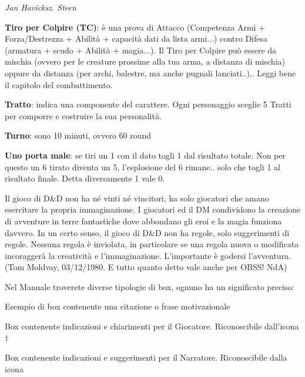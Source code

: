 \begin{multicols}{2}
\begin{center}
\emph{Jan Havicksz. Steen}
\end{center}

\textbf{Tiro per Colpire (TC)}: è una prova di Attacco (Competenza Armi + Forza/Destrezza + Abilità + capacità dati da lista armi...) contro Difesa (armatura + scudo + Abilità + magia...). Il Tiro per Colpire può essere da mischia (ovvero per le creature prossime alla tua arma, a distanza di mischia) oppure da distanza (per archi, balestre, ma anche pugnali lanciati..).. Leggi bene il capitolo del combattimento.

\textbf{Tratto}: indica una componente del carattere. Ogni personaggio sceglie 5 Tratti per comporre e costruire la sua personalità.

\textbf{Turno}: sono 10 minuti, ovvero 60 round

\textbf{Uno porta male}: se tiri un 1 con il dato togli 1 dal risultato totale. Non per questo un 6 tirato diventa un 5, l'esplosione del 6 rimane.. solo che togli 1 al risultato finale. Detta diversamente 1 vale 0.

\begin{enfasi}
Il gioco di D\&D non ha né vinti né vincitori, ha solo giocatori che amano esercitare la propria immaginazione. I giocatori ed il DM condividono la creazione di avventure in terre fantastiche dove abbondano gli eroi e la magia funziona davvero. In un certo senso, il gioco di D\&D non ha regole, solo suggerimenti di regole. Nessuna regola è inviolata, in particolare se una regola nuova o modificata incoraggerà la creatività e l'immaginazione. L'importante è godersi l'avventura. (Tom Moldvay, 03/12/1980. E tutto quanto detto vale anche per OBSS! NdA)
\end{enfasi}

\medskip

Nel Manuale troverete diverse tipologie di box, ognuno ha un significato preciso:

\medskip

\begin{enfasi}{Esempio di box contenente una citazione o frase motivazionale}\end{enfasi}

\begin{giocatore}Box contenente indicazioni e chiarimenti per il Giocatore. Riconoscibile dall'icona $\dagger$\end{giocatore}

\begin{narratore}Box contenente indicazioni e suggerimenti per il Narratore. Riconoscibile dalla icona {\faBook}\end{narratore}

\end{multicols}


